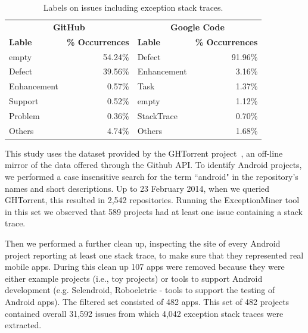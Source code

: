 \begin{table}
  \centering
  \begin{tabular}{lr|lr}
    \hline
     \multicolumn{2}{c}{\bfseries{GitHub}} &  \multicolumn{2}{c}{\bfseries{Google Code}} \\
      \bfseries{Lable} &  \bfseries{\% Occurrences} &  \bfseries{Lable} &  \bfseries{\% Occurrences} \\
    \hline
empty &	54.24\% & Defect &	91.96\% \\
Defect &	39.56\%  & Enhancement  &	3.16\% \\
Enhancement &	0.57\% & Task	& 1.37\% \\
Support &	0.52\% & empty &	1.12\% \\
Problem &	0.36\% & StackTrace &	0.70\% \\
Others &	4.74\% &  Others &	1.68\% \\   
  \hline
  \end{tabular}
  \caption{Labels on issues including exception stack traces.}
  \label{tab:lables}
\end{table}


This study uses the dataset provided by the GHTorrent project~\cite{Gousi13}, 
an off-line mirror of the data  offered through the Github API.  
To identify Android projects, we performed a case insensitive search for the
term ``android" in the repository's names and short descriptions.  
Up to 23 February 2014,  when we queried GHTorrent, this resulted in 2,542 repositories. Running the ExceptionMiner tool 
 in this set we observed that 589 projects had at least one issue containing a stack trace.
	
Then we performed a further clean up, inspecting the site of every Android project
reporting at least one stack trace, to make sure that they represented real
mobile apps. During this clean up 107 apps were removed because they were either
example projects (i.e., toy projects) or tools to support Android development
(e.g. Selendroid, Roboeletric - tools to support the testing of Android apps).
The filtered set consisted of 482 apps. This set of 482 projects contained overall 31,592 issues from which 4,042 exception stack traces 
were extracted. 

